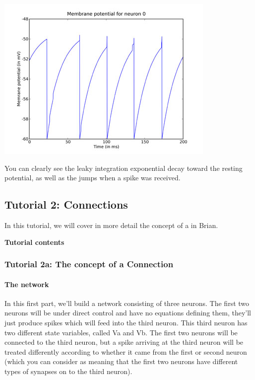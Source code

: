 \documentclass[letterpaper,10pt,english]{manual}
\begin{document}
\includegraphics{1g.jpg}

You can clearly see the leaky integration exponential decay
toward the resting potential, as well as the jumps when a
spike was received.

\resetcurrentobjects
\hypertarget{--doc-tutorial2_connections}{}

\hypertarget{tutorial2-connections}{}\subsection{Tutorial 2: Connections}

In this tutorial, we will cover in more detail the concept of a \hyperlink{brian.Connection}{}
in Brian.

\textbf{Tutorial contents}

\resetcurrentobjects
\hypertarget{--doc-tutorial_2a_the_concept_of_a_connection}{}

\subsubsection{Tutorial 2a: The concept of a Connection}


\paragraph{The network}

In this first part, we'll build a network consisting of three neurons. The
first two neurons will be under direct control and have no equations
defining them, they'll just produce spikes which will feed into the third
neuron. This third neuron has two different state variables, called Va
and Vb. The first two neurons will be connected to the third neuron, but
a spike arriving at the third neuron will be treated differently
according to whether it came from the first or second neuron (which you
can consider as meaning that the first two neurons have different
types of synapses on to the third neuron).
\end{document}
